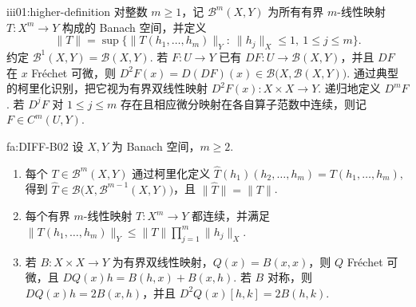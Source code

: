 \begin{FADefinition}{iii01:higher-definition}
对整数 \(\displaystyle m\geqslant1\)，记 \(\displaystyle\mathcal B^m(X,Y)\) 为所有有界 \(\displaystyle m\)-线性映射 \(\displaystyle T:X^m\to Y\) 构成的 Banach 空间，并定义
\[
\|T\|
=
\sup\{\|T(h_1,\dots,h_m)\|_Y:\ \|h_j\|_X\leqslant1,\ 1\leqslant j\leqslant m\}.
\]
约定 \(\displaystyle\mathcal B^1(X,Y)=\mathcal B(X,Y)\). 若 \(\displaystyle F:U\to Y\) 已有 \(\displaystyle DF:U\to\mathcal B(X,Y)\)，并且 \(\displaystyle DF\) 在 \(\displaystyle x\) Fréchet 可微，则
\(\displaystyle D^2F(x)=D(DF)(x)\in\mathcal B\bigl(X,\mathcal B(X,Y)\bigr).\)
通过典型的柯里化识别，把它视为有界双线性映射 \(\displaystyle D^2F(x):X\times X\to Y\). 递归地定义 \(\displaystyle D^mF\). 若 \(\displaystyle D^jF\) 对 \(\displaystyle1\leqslant j\leqslant m\) 存在且相应微分映射在各自算子范数中连续，则记 \(\displaystyle F\in C^m(U,Y)\).
\end{FADefinition}

\begin{FATheorem}[B][若干高阶微分性质]{fa:DIFF-B02}
设 \(\displaystyle X,Y\) 为 Banach 空间，\(\displaystyle m\geqslant2\).
\begin{enumerate}
\item 每个 \(\displaystyle T\in\mathcal B^m(X,Y)\) 通过柯里化定义
\(\displaystyle \widehat T(h_1)(h_2,\dots,h_m) = T(h_1,\dots,h_m),\)
得到 \(\displaystyle\widehat T\in\mathcal B\bigl(X,\mathcal B^{m-1}(X,Y)\bigr)\)，且 \(\displaystyle\|\widehat T\|=\|T\|\).
\item 每个有界 \(\displaystyle m\)-线性映射 \(\displaystyle T:X^m\to Y\) 都连续，并满足
\(\displaystyle \|T(h_1,\dots,h_m)\|_Y \leqslant \|T\|\prod_{j=1}^m\|h_j\|_X.\)
\item 若 \(\displaystyle B:X\times X\to Y\) 为有界双线性映射，\(\displaystyle Q(x)=B(x,x)\)，则 \(\displaystyle Q\) Fréchet 可微，且
\(\displaystyle DQ(x)h = B(h,x)+B(x,h).\)
若 \(\displaystyle B\) 对称，则 \(\displaystyle DQ(x)h=2B(x,h)\)，并且 \(\displaystyle D^2Q(x)[h,k]=2B(h,k)\).
\end{enumerate}
\end{FATheorem}

